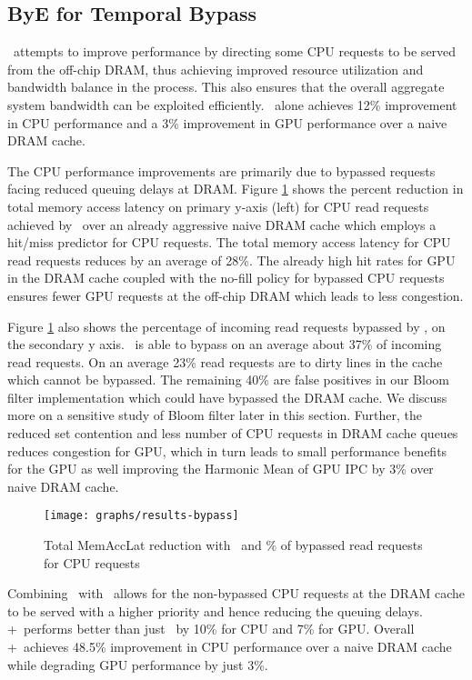 \subsection{ByE for Temporal Bypass}
\bypassname\ attempts to improve performance by directing some CPU requests to be served from the off-chip DRAM, thus achieving improved resource utilization and bandwidth balance in the process. This also ensures that the overall aggregate system bandwidth can be exploited efficiently. \bypassname\ alone achieves 12\% improvement in CPU performance and a 3\% improvement in GPU performance over a naive DRAM cache.
\par The CPU performance improvements are primarily due to bypassed requests facing reduced queuing delays at DRAM. Figure \ref{results-bloom} shows the percent reduction in total memory access latency on primary y-axis (left) for CPU read requests achieved by \bypassname\ over an already aggressive naive DRAM cache which employs a hit/miss predictor for CPU requests. The total memory access latency for CPU read requests reduces by an average of 28\%. The already high hit rates for GPU in the DRAM cache coupled with the no-fill policy for bypassed CPU requests ensures fewer GPU requests at the off-chip DRAM which leads to less congestion. 
\par Figure \ref{results-bloom} also shows the percentage of incoming read requests bypassed by \bypassname, on the secondary y axis. 
\bypassname\ is able to bypass on an average about 37\% of incoming read requests. On an average 23\% read requests are to dirty lines in the cache which cannot be bypassed.  The remaining 40\% are false positives in our Bloom filter implementation which could have bypassed the DRAM cache. We discuss more on a sensitive study of Bloom filter later in this section. Further, the reduced set contention and less number of CPU requests in DRAM cache queues reduces congestion for GPU, which in turn leads to small performance benefits for the GPU as well improving the Harmonic Mean of GPU IPC by 3\% over naive DRAM cache.

\begin{figure}[!htb]
    \centering
    \texttt{[image: graphs/results-bypass]}
    \caption{Total MemAccLat reduction with \bypassname\ and \% of bypassed read requests for CPU requests}
    \label{results-bloom}
\end{figure}

\par Combining \prioname\ with \bypassname\ allows for the non-bypassed CPU requests at the DRAM cache to be served with a higher priority and hence reducing the queuing delays. \bypassname+\prioname\ performs better than just \prioname\ by 10\% for CPU and 7\% for GPU. Overall \bypassname+\prioname\ achieves 48.5\% improvement in CPU performance over a naive DRAM cache while degrading GPU performance by just 3\%.


